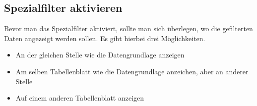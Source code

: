 \subsection{Spezialfilter aktivieren}

Bevor man das Spezialfilter aktiviert, sollte man sich überlegen, wo die gefilterten Daten angezeigt werden sollen. Es gibt hierbei drei Möglichkeiten.
\begin{itemize}
	\smallitemize	
	\item An der gleichen Stelle wie die Datengrundlage anzeigen
	\item Am selben Tabellenblatt wie die Datengrundlage anzeichen, aber an anderer Stelle
	\item Auf einem anderen Tabellenblatt anzeigen
\end{itemize}

